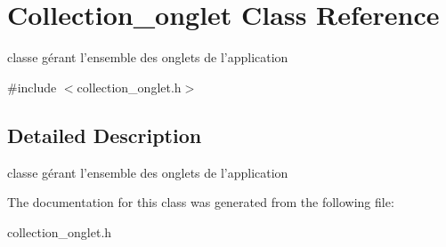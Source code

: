 \hypertarget{classCollection__onglet}{
\section{Collection\_\-onglet Class Reference}
\label{classCollection__onglet}
}


classe gérant l'ensemble des onglets de l'application  




{\ttfamily \#include $<$collection\_\-onglet.h$>$}



\subsection{Detailed Description}
classe gérant l'ensemble des onglets de l'application 

The documentation for this class was generated from the following file:\begin{DoxyCompactItemize}
\item 
collection\_\-onglet.h\end{DoxyCompactItemize}
